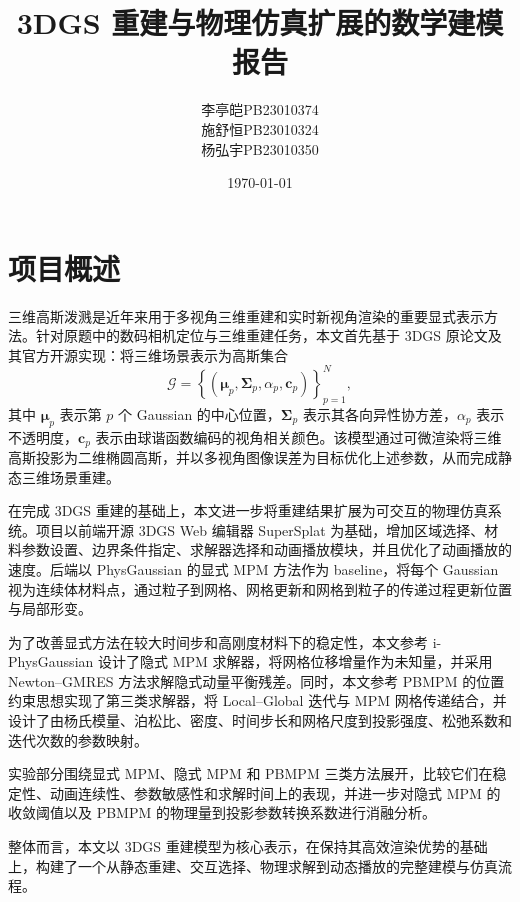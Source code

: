 \documentclass[a4paper]{article}
\title{\textbf{3DGS 重建与物理仿真扩展的数学建模报告}}
\author{李亭皑\quad PB23010374\\施舒恒\quad PB23010324\\杨弘宇\quad PB23010350}
\date{\today}
\begin{document}
\maketitle

\section{项目概述}

三维高斯泼溅是近年来用于多视角三维重建和实时新视角渲染的重要显式表示方法。针对原题中的数码相机定位与三维重建任务，本文首先基于 3DGS 原论文及其官方开源实现：将三维场景表示为高斯集合
\[
    \mathcal{G}
    =
    \left\{
        \left(
            \bm{\mu}_p,
            \bm{\Sigma}_p,
            \alpha_p,
            \bm{c}_p
        \right)
    \right\}_{p=1}^{N},
\]
其中 $\bm{\mu}_p$ 表示第 $p$ 个 Gaussian 的中心位置，$\bm{\Sigma}_p$ 表示其各向异性协方差，$\alpha_p$ 表示不透明度，$\bm{c}_p$ 表示由球谐函数编码的视角相关颜色。该模型通过可微渲染将三维高斯投影为二维椭圆高斯，并以多视角图像误差为目标优化上述参数，从而完成静态三维场景重建。

在完成 3DGS 重建的基础上，本文进一步将重建结果扩展为可交互的物理仿真系统。项目以前端开源 3DGS Web 编辑器 SuperSplat 为基础，增加区域选择、材料参数设置、边界条件指定、求解器选择和动画播放模块，并且优化了动画播放的速度。后端以 PhysGaussian 的显式 MPM 方法作为 baseline，将每个 Gaussian 视为连续体材料点，通过粒子到网格、网格更新和网格到粒子的传递过程更新位置与局部形变。

为了改善显式方法在较大时间步和高刚度材料下的稳定性，本文参考 i-PhysGaussian 设计了隐式 MPM 求解器，将网格位移增量作为未知量，并采用 Newton--GMRES 方法求解隐式动量平衡残差。同时，本文参考 PBMPM 的位置约束思想实现了第三类求解器，将 Local--Global 迭代与 MPM 网格传递结合，并设计了由杨氏模量、泊松比、密度、时间步长和网格尺度到投影强度、松弛系数和迭代次数的参数映射。

实验部分围绕显式 MPM、隐式 MPM 和 PBMPM 三类方法展开，比较它们在稳定性、动画连续性、参数敏感性和求解时间上的表现，并进一步对隐式 MPM 的收敛阈值以及 PBMPM 的物理量到投影参数转换系数进行消融分析。

整体而言，本文以 3DGS 重建模型为核心表示，在保持其高效渲染优势的基础上，构建了一个从静态重建、交互选择、物理求解到动态播放的完整建模与仿真流程。
\end{document}
